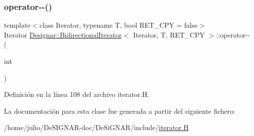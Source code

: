 \subsubsection{\texorpdfstring{operator-\/-\/()}{operator--()}\hspace{0.1cm}{\footnotesize\ttfamily [2/2]}}
{\footnotesize\ttfamily template$<$class Iterator, typename T, bool R\+E\+T\+\_\+\+C\+PY = false$>$ \\
Iterator \hyperlink{class_designar_1_1_bidirectional_iterator}{Designar\+::\+Bidirectional\+Iterator}$<$ Iterator, T, R\+E\+T\+\_\+\+C\+PY $>$\+::operator-\/-\/ (\begin{DoxyParamCaption}\item[{int}]{ }\end{DoxyParamCaption})\hspace{0.3cm}{\ttfamily [inline]}}



Definición en la línea 108 del archivo iterator.\+H.



La documentación para esta clase fue generada a partir del siguiente fichero\+:\begin{DoxyCompactItemize}
\item 
/home/julio/\+De\+S\+I\+G\+N\+A\+R-\/doc/\+De\+Si\+G\+N\+A\+R/include/\hyperlink{iterator_8_h}{iterator.\+H}\end{DoxyCompactItemize}

